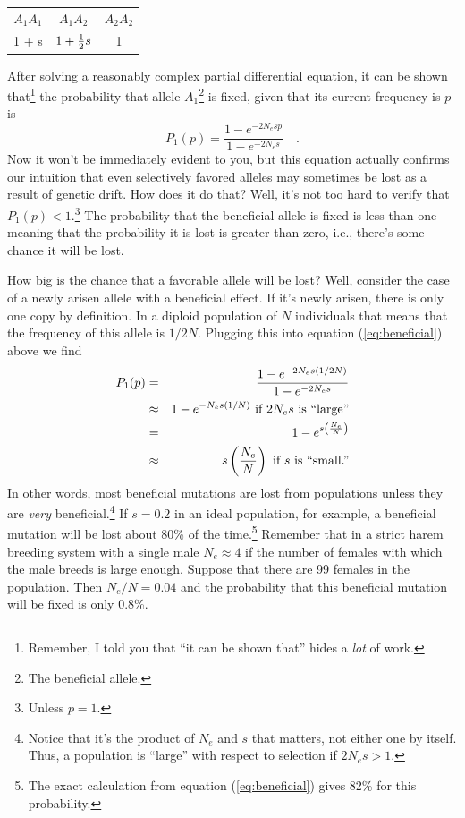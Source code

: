 \begin{center}
\begin{tabular}{ccc}
$A_1A_1$ & $A_1A_2$      & $A_2A_2$ \\
1 + s    & $1 + \frac{1}{2} s$ & 1
\end{tabular}
\end{center}

After solving a reasonably complex partial differential equation, it
can be shown that\footnote{Remember, I told you that ``it can be shown
that'' hides a {\it lot\/} of work.} the probability that allele
$A_1$\footnote{The beneficial allele.}  is fixed, given that its
current frequency is $p$ is
\begin{equation}
P_1(p) = \frac{1 - e^{-2N_esp}}{1 - e^{-2N_es}} \quad .
\label{eq:beneficial}
\end{equation}
Now it won't be immediately evident to you, but this equation actually
confirms our intuition that even selectively favored alleles may
sometimes be lost as a result of genetic drift. How does it do that?
Well, it's not too hard to verify that $P_1(p) < 1$.\footnote{Unless
  $p=1$.} The probability that the beneficial allele is fixed is less
than one meaning that the probability it is lost is greater than zero,
i.e., there's some chance it will be lost.

How big is the chance that a favorable allele will be
lost? Well, consider the
case of a newly arisen allele with a beneficial effect. If it's newly
arisen, there is only one copy by definition. In a diploid population
of $N$ individuals that means that the frequency of this allele is
$1/2N$. Plugging this into equation (\ref{eq:beneficial}) above we
find
\begin{eqnarray*}
P_1(p) &=& \frac{1 - e^{-2N_es(1/2N)}}{1 - e^{-2N_es}} \\
       &\approx& 1 - e^{-N_es(1/N)} \hbox{ if $2N_es$ is ``large''} \\
       &=& 1 - e^{s\left(\frac{N_e}{N}\right)} \\
       &\approx& s\left(\frac{N_e}{N}\right)
                 \hbox{ if $s$ is ``small.''}
\end{eqnarray*}
In other words, most beneficial mutations are lost from populations
unless they are {\it very\/} beneficial.\footnote{Notice that it's the
  product of $N_e$ and $s$ that matters, not either one by
  itself. Thus, a population is ``large'' with respect to selection if
  $2N_es > 1$.} If $s=0.2$ in an ideal population, for example, a
beneficial mutation will be lost about 80\% of the time.\footnote{The
  exact calculation from equation (\ref{eq:beneficial}) gives 82\% for
  this probability.} Remember that in a strict harem breeding system
with a single male $N_e \approx 4$ if the number of females with which
the male breeds is large enough. Suppose that there are 99 females in
the population. Then $N_e/N = 0.04$ and the probability that this
beneficial mutation will be fixed is only 0.8\%.


